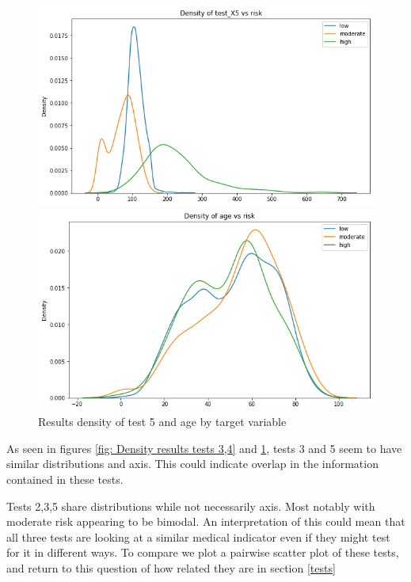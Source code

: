 \documentclass[a4paper]{article}
\begin{document}
\begin{figure}[h]
\begin{minipage}[b]{0.45\linewidth}
\centering
\includegraphics[width=\textwidth]{Materials//Density Plots/test5.png}
\end{minipage}
\hspace{0.25cm}
\begin{minipage}[b]{0.45\linewidth}
\centering
\includegraphics[width=\textwidth]{Materials//Density Plots/Age.png}
\end{minipage}
\caption{Results density of test 5 and age  by target variable}
\label{fig: Density results test 5 and age}
\end{figure}

As seen in figures \ref{fig: Density results tests 3,4} and \ref{fig: Density results test 5 and age}, tests 3 and 5 seem to have similar distributions and axis. This could indicate overlap in the information contained in these tests. 

Tests 2,3,5 share distributions while not necessarily axis. Most notably with moderate risk appearing to be bimodal. An interpretation of this could mean that all three tests are looking at a similar medical indicator even if they might test for it in different ways. To compare we plot a pairwise scatter plot of these tests, and return to this question of how related they are in section \ref{tests}
\end{document}
